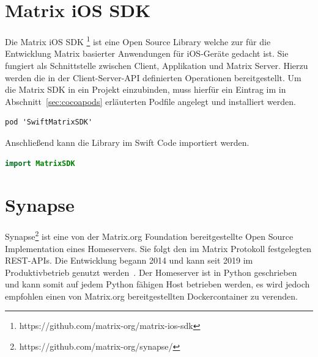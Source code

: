     \section{Matrix iOS SDK}\label{sec:matrix-sdk}
    Die Matrix iOS SDK \footnote{https://github.com/matrix-org/matrix-ios-sdk} ist eine Open Source Library welche zur für die Entwicklung Matrix basierter Anwendungen für iOS-Geräte gedacht ist.
    Sie fungiert als Schnittstelle zwischen Client, Applikation und Matrix Server.
    Hierzu werden die in der Client-Server-API definierten Operationen bereitgestellt.
    Um die Matrix SDK in ein Projekt einzubinden, muss hierfür ein Eintrag im in Abschnitt~\ref{sec:cocoapods} erläuterten Podfile angelegt und installiert werden.
    ~\cite{matrixiossdk}
    \begin{lstlisting}[language={},label={lst:matrtix-sdk}]
        pod 'SwiftMatrixSDK'
    \end{lstlisting}
    Anschließend kann die Library im Swift Code importiert werden.
    \begin{lstlisting}[language=swift,label={lst:matrtix-sdk-swift}]
        import MatrixSDK
    \end{lstlisting}

    \section{Synapse}\label{sec:synapse}
    Synapse\footnote{https://github.com/matrix-org/synapse/} ist eine von der Matrix.org Foundation bereitgestellte Open Source Implementation eines Homeservers.
    Sie folgt den im Matrix Protokoll festgelegten REST-APIs.
    Die Entwicklung begann 2014 und kann seit 2019 im Produktivbetrieb genutzt werden~\cite{synapse}.
    Der Homeserver ist in Python geschrieben und kann somit auf jedem Python fähigen Host betrieben werden, es wird jedoch empfohlen einen von Matrix.org bereitgestellten Dockercontainer zu verenden.

